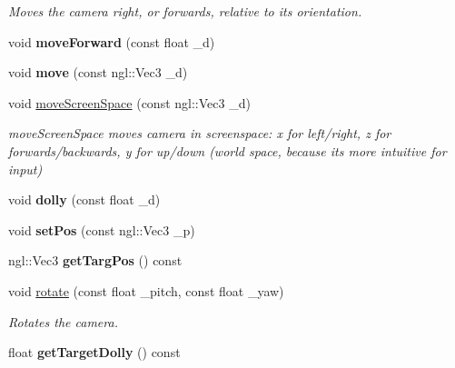 \begin{DoxyCompactItemize}
\begin{DoxyCompactList}\small\item\em Moves the camera right, or forwards, relative to its orientation. \end{DoxyCompactList}\item 
\hypertarget{class_camera_affc95de91347cc008cb745a185f3d0c8}{}void {\bfseries move\+Forward} (const float \+\_\+d)\label{class_camera_affc95de91347cc008cb745a185f3d0c8}

\item 
\hypertarget{class_camera_a2804829a882cb5395f9067bca7547959}{}void {\bfseries move} (const ngl\+::\+Vec3 \+\_\+d)\label{class_camera_a2804829a882cb5395f9067bca7547959}

\item 
void \hyperlink{class_camera_a352d3bac2cf10e1320a4227c1a8e065e}{move\+Screen\+Space} (const ngl\+::\+Vec3 \+\_\+d)
\begin{DoxyCompactList}\small\item\em move\+Screen\+Space moves camera in screenspace\+: x for left/right, z for forwards/backwards, y for up/down (world space, because it\textquotesingle{}s more intuitive for input) \end{DoxyCompactList}\item 
\hypertarget{class_camera_ad4acc2682141575e73881de21a587572}{}void {\bfseries dolly} (const float \+\_\+d)\label{class_camera_ad4acc2682141575e73881de21a587572}

\item 
\hypertarget{class_camera_aaf1a443438194f054d985586dbaba91c}{}void {\bfseries set\+Pos} (const ngl\+::\+Vec3 \+\_\+p)\label{class_camera_aaf1a443438194f054d985586dbaba91c}

\item 
\hypertarget{class_camera_ab84a163e6ac327d30a86de88b80a40e4}{}ngl\+::\+Vec3 {\bfseries get\+Targ\+Pos} () const \label{class_camera_ab84a163e6ac327d30a86de88b80a40e4}

\item 
\hypertarget{class_camera_a6a23d151bb200186d0b1e9a264e6ab9d}{}void \hyperlink{class_camera_a6a23d151bb200186d0b1e9a264e6ab9d}{rotate} (const float \+\_\+pitch, const float \+\_\+yaw)\label{class_camera_a6a23d151bb200186d0b1e9a264e6ab9d}

\begin{DoxyCompactList}\small\item\em Rotates the camera. \end{DoxyCompactList}\item 
\hypertarget{class_camera_a2bfc21739f790432f59d2a040ad8e7e6}{}float {\bfseries get\+Target\+Dolly} () const \label{class_camera_a2bfc21739f790432f59d2a040ad8e7e6}


\end{DoxyCompactItemize}
